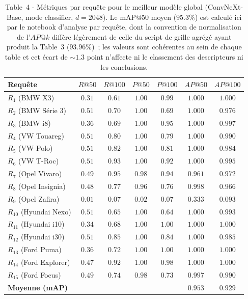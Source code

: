 \documentclass[a4paper,11pt]{article}
\begin{document}
\begin{table}[H]
\centering
\small
\begin{tabular}{lcccccc}
\toprule
Requête & $R@50$ & $R@100$ & $P@50$ & $P@100$ & $AP@50$ & $AP@100$ \\
\midrule
$R_1$  (BMW X3)            & $0.31$ & $0.61$ & $1.00$ & $0.99$ & $1.000$ & $1.000$ \\
$R_2$  (BMW S\'erie 3)     & $0.51$ & $0.70$ & $1.00$ & $0.69$ & $1.000$ & $0.976$ \\
$R_3$  (BMW i8)            & $0.36$ & $0.69$ & $1.00$ & $0.95$ & $1.000$ & $0.997$ \\
$R_4$  (VW Touareg)        & $0.51$ & $0.80$ & $1.00$ & $0.79$ & $1.000$ & $0.990$ \\
$R_5$  (VW Polo)           & $0.51$ & $0.82$ & $1.00$ & $0.81$ & $1.000$ & $0.984$ \\
$R_6$  (VW T-Roc)          & $0.51$ & $0.93$ & $1.00$ & $0.92$ & $1.000$ & $0.995$ \\
$R_7$  (Opel Vivaro)       & $0.49$ & $0.95$ & $0.98$ & $0.94$ & $0.961$ & $0.972$ \\
$R_8$  (Opel Insignia)     & $0.48$ & $0.77$ & $0.96$ & $0.76$ & $0.998$ & $0.966$ \\
$R_9$  (Opel Zafira)       & $0.01$ & $0.07$ & $0.02$ & $0.07$ & $\mathbf{0.333}$ & $\mathbf{0.093}$ \\
$R_{10}$ (Hyundai Nexo)    & $0.51$ & $0.65$ & $1.00$ & $0.64$ & $1.000$ & $0.993$ \\
$R_{11}$ (Hyundai i10)     & $0.34$ & $0.68$ & $1.00$ & $1.00$ & $1.000$ & $1.000$ \\
$R_{12}$ (Hyundai i30)     & $0.51$ & $0.85$ & $1.00$ & $0.84$ & $1.000$ & $0.985$ \\
$R_{13}$ (Ford Puma)       & $0.36$ & $0.72$ & $1.00$ & $1.00$ & $1.000$ & $1.000$ \\
$R_{14}$ (Ford Explorer)   & $0.47$ & $0.92$ & $1.00$ & $0.98$ & $1.000$ & $1.000$ \\
$R_{15}$ (Ford Focus)      & $0.49$ & $0.74$ & $0.98$ & $0.73$ & $0.997$ & $0.990$ \\
\midrule
\textbf{Moyenne (mAP)}    &        &        &        &        & $\mathbf{0.953}$ & $\mathbf{0.929}$ \\
\bottomrule
\end{tabular}
\caption{Table~4 - Métriques par requête pour le meilleur modèle global
(ConvNeXt-Base, mode classifier, $d=2048$). Le $\text{mAP}@50$ moyen
($95.3\%$) est calculé ici par le notebook d'analyse par requête, dont
la convention de normalisation de l'$AP@k$ diffère légèrement de celle
du script de grille agrégé ayant produit la Table~3 ($93.96\%$)~; les
valeurs sont cohérentes au sein de chaque table et cet écart de
$\sim 1.3$ point n'affecte ni le classement des descripteurs ni les
conclusions.}
\label{tab:per_query}
\end{table}
\end{document}
